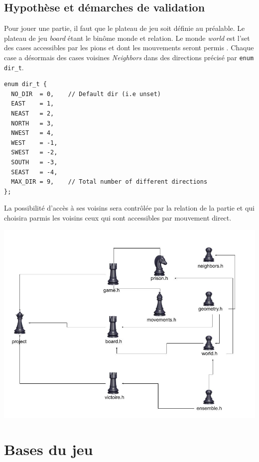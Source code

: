 \documentclass[a4paper]{article}
\begin{document}
\subsection{Hypothèse et démarches de validation}
Pour jouer une partie, il faut que le plateau de jeu soit définie au préalable. Le plateau de jeu \textit{board}  étant 
le binôme monde et relation. 
Le monde \textit{world} est l’set des cases accessibles par les pions et dont les mouvements seront permis . Chaque case a 
désormais des cases voisines \textit{Neighbors} dans des directions précisé par \lstinline|enum dir_t|.
\begin{lstlisting}
enum dir_t {
  NO_DIR  = 0,    // Default dir (i.e unset)
  EAST    = 1,
  NEAST   = 2,
  NORTH   = 3,
  NWEST   = 4,
  WEST    = -1,
  SWEST   = -2,
  SOUTH   = -3,
  SEAST   = -4,
  MAX_DIR = 9,    // Total number of different directions
};
\end{lstlisting}
La possibilité d’accès à ses voisins sera contrôlée par la relation de la partie et qui choisira parmis les voisins ceux qui sont
 accessibles par mouvement direct.  
 
 
 \begin{center}
\includegraphics[scale=0.5]{Dessin sans titre.jpg} 

\end{center}

\section{Bases du jeu}
\end{document}
